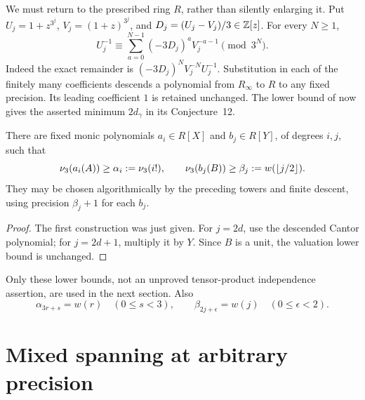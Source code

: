 We must return to the prescribed ring $R$, rather than silently enlarging
it. Put $U_j=1+z^{3^j}$, $V_j=(1+z)^{3^j}$, and
$D_j=(U_j-V_j)/3\in\mathbb Z[z]$. For every $N\ge1$,
\begin{equation}\label{eq:descent}
 U_j^{-1}\equiv
 \sum_{a=0}^{N-1}(-3D_j)^a V_j^{-a-1}\pmod{3^N}.
\end{equation}
Indeed the exact remainder is
$(-3D_j)^N V_j^{-N}U_j^{-1}$. Substitution in each of the finitely
many coefficients descends a polynomial from $R_\infty$ to $R$ to any
fixed precision. Its leading coefficient $1$ is retained unchanged.
The lower bound of \cite[Theorem~10]{KM3} now gives the asserted minimum
$2d_\gamma$ in its Conjecture~12.

\begin{proposition}\label{prop:bases}
There are fixed monic polynomials $a_i\in R[X]$ and $b_j\in R[Y]$,
of degrees $i,j$, such that
\[
 \nu_3(a_i(A))\ge\alpha_i:=\nu_3(i!),\qquad
 \nu_3(b_j(B))\ge\beta_j:=w(\lfloor j/2\rfloor).
\]
They may be chosen algorithmically by the preceding towers and finite
descent, using precision $\beta_j+1$ for each $b_j$.
\end{proposition}
\begin{proof}
The first construction was just given. For $j=2d$, use the descended
Cantor polynomial; for $j=2d+1$, multiply it by $Y$.
Since $B$ is a unit, the valuation lower bound is unchanged.
\end{proof}

Only these lower bounds, not an unproved tensor-product independence
assertion, are used in the next section. Also
\begin{equation}\label{eq:alphaidentity}
 \alpha_{3r+s}=w(r)\quad(0\le s<3),\qquad
 \beta_{2j+\epsilon}=w(j)\quad(0\le\epsilon<2).
\end{equation}

\section{Mixed spanning at arbitrary precision}

